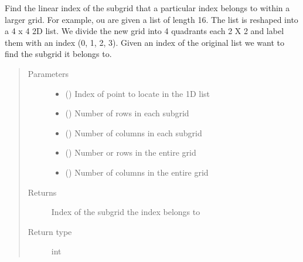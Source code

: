 \documentclass[letterpaper,10pt,english]{sphinxmanual}
\begin{document}
\begin{fulllineitems}
\begin{fulllineitems}
\label{\detokenize{polo.widgets:polo.widgets.plate_viewer.plateViewer.well_index_to_subgrid}}
Find the linear index of the subgrid that a particular index belongs to
within a larger grid. For example, ou are given a list of length 16.
The list is reshaped into a 4 x 4
2D list. We divide the new grid into 4 quadrants each 2 X 2 and label them
with an index (0, 1, 2, 3). Given an index of the original list we want to
find the subgrid it belongs to.
\begin{quote}\begin{description}
\item[{Parameters}] \leavevmode\begin{itemize}
\item {} 
 () \textendash{} Index of point to locate in the 1D list

\item {} 
 () \textendash{} Number of rows in each subgrid

\item {} 
 () \textendash{} Number of columns in each subgrid

\item {} 
 () \textendash{} Number or rows in the entire grid

\item {} 
 () \textendash{} Number of columns in the entire grid

\end{itemize}

\item[{Returns}] \leavevmode
Index of the subgrid the index  belongs to

\item[{Return type}] \leavevmode
int

\end{description}\end{quote}


\end{fulllineitems}
\end{fulllineitems}
\end{document}
